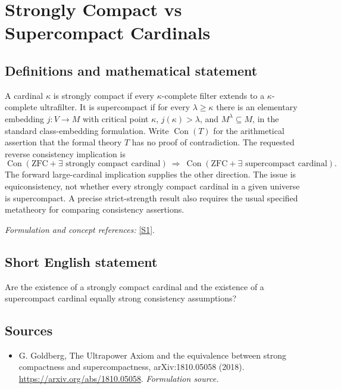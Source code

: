 \documentclass[11pt]{article}
\begin{document}
\section*{\texorpdfstring{Strongly Compact vs Supercompact Cardinals}{Strongly Compact vs Supercompact Cardinals}}\label{1354}
\subsection{Definitions and mathematical statement}
A cardinal $\kappa$ is strongly compact if every $\kappa$-complete filter extends to a $\kappa$-complete ultrafilter. It is supercompact if for every $\lambda\ge\kappa$ there is an elementary embedding $j:V\to M$ with critical point $\kappa$, $j(\kappa)>\lambda$, and $M^\lambda\subseteq M$, in the standard class-embedding formulation. Write $\operatorname{Con}(T)$ for the arithmetical assertion that the formal theory $T$ has no proof of contradiction. The requested reverse consistency implication is
\[
 \operatorname{Con}(\mathrm{ZFC}+\exists\text{ strongly compact cardinal})
 \ \Longrightarrow\
 \operatorname{Con}(\mathrm{ZFC}+\exists\text{ supercompact cardinal}).
\]
The forward large-cardinal implication supplies the other direction. The issue is equiconsistency, not whether every strongly compact cardinal in a given universe is supercompact. A precise strict-strength result also requires the usual specified metatheory for comparing consistency assertions.
\par\smallskip\textit{Formulation and concept references:} \href{https://arxiv.org/abs/1810.05058}{[S1]}.

\subsection{Short English statement}
Are the existence of a strongly compact cardinal and the existence of a supercompact cardinal equally strong consistency assumptions?
\subsection{Sources}
\begin{itemize}
\item[S1]G. Goldberg, The Ultrapower Axiom and the equivalence between strong compactness and supercompactness, arXiv:1810.05058 (2018).
\url{https://arxiv.org/abs/1810.05058}.
\textit{Formulation source.}
\end{itemize}
\end{document}
